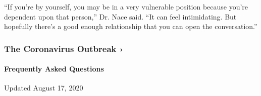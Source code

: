 ``If you're by yourself, you may be in a very vulnerable position
because you're dependent upon that person,'' Dr. Nace said. ``It can
feel intimidating. But hopefully there's a good enough relationship that
you can open the conversation.''

\href{https://www.nytimes3xbfgragh.onion/news-event/coronavirus?action=click\&pgtype=Article\&state=default\&region=MAIN_CONTENT_3\&context=storylines_faq}{}

\hypertarget{the-coronavirus-outbreak-}{%
\subsubsection{The Coronavirus Outbreak
›}\label{the-coronavirus-outbreak-}}

\hypertarget{frequently-asked-questions}{%
\paragraph{Frequently Asked
Questions}\label{frequently-asked-questions}}

Updated August 17, 2020


